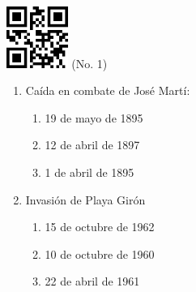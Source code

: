 \documentclass[twocolumn]{article}
\title{}
\date{}
\begin{document}

\begin{center}
 \hspace{0.2cm}
 \includegraphics[width=2cm]{qrcode-1.png}
 \hspace{0.5cm}
 \Large{  (No. 1) }
\end{center}



\begin{enumerate}



  \item Caída en combate de José Martí:

  \begin{enumerate}
   
   \item 19 de mayo de 1895
   
   \item 12 de abril de 1897
   
   \item 1 de abril de 1895
   
  \end{enumerate}



  \item Invasión de Playa Girón

  \begin{enumerate}
   
   \item 15 de octubre de 1962
   
   \item 10 de octubre de 1960
   
   \item 22 de abril de 1961
   
  \end{enumerate}


\end{enumerate}


\end{document}
